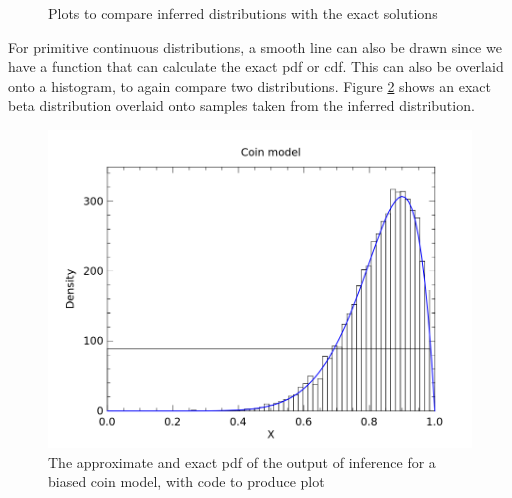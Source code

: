 \begin{figure}[!htb]
	\centering
	\qquad
	\caption{Plots to compare inferred distributions with the exact solutions}
	\label{fig:vis-qq}
\end{figure}
	
For primitive continuous distributions, a smooth line can also be drawn since we have a function that can calculate the exact pdf or cdf. This can also be overlaid onto a histogram, to again compare two distributions. Figure \ref{fig:vis-samples} shows an exact beta distribution overlaid onto samples taken from the inferred distribution.
	
\begin{figure}[!htb]
	\centering														
	\begin{minipage}{0.45\textwidth}
		\centering
	\end{minipage}
	\begin{minipage}{0.45\textwidth}
		\centering
		\includegraphics[width=\linewidth]{figs/coin_compare.png}
	\end{minipage}
	\caption{The approximate and exact pdf of the output of inference for a biased coin model, with code to produce plot}
	\label{fig:vis-samples}
\end{figure}
	
